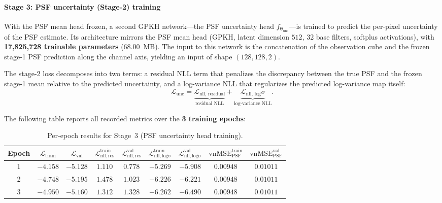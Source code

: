 \documentclass{aa}
\begin{document}
\paragraph{Stage 3: PSF uncertainty (Stage-2) training}

With the PSF mean head frozen, a second GPKH network---the PSF uncertainty head $f_{\boldsymbol{\theta}_\mathrm{unc}}$---is trained to predict the per-pixel uncertainty of the PSF estimate. Its architecture mirrors the PSF mean head (GPKH, latent dimension $512$, 32 base filters, softplus activations), with \textbf{17,825,728 trainable parameters} (68.00~MB). The input to this network is the concatenation of the observation cube and the frozen stage-1 PSF prediction along the channel axis, yielding an input of shape $(128, 128, 2)$.

The stage-2 loss decomposes into two terms: a residual NLL term that penalizes the discrepancy between the true PSF and the frozen stage-1 mean relative to the predicted uncertainty, and a log-variance NLL that regularizes the predicted log-variance map itself:
\begin{equation}
\mathcal{L}_\mathrm{unc}
=
\underbrace{\mathcal{L}_\mathrm{nll,\,residual}}_{\text{residual NLL}}
+
\underbrace{\mathcal{L}_\mathrm{nll,\,log}\sigma}_{\text{log-variance NLL}}.
\end{equation}

The following table reports all recorded metrics over the \textbf{3 training epochs}:

\begin{table}[h]
\centering
\begin{tabular}{|c|c|c|c|c|c|c|c|c|}
\hline
\textbf{Epoch} & $\mathcal{L}_\mathrm{train}$ & $\mathcal{L}_\mathrm{val}$ & $\mathcal{L}_\mathrm{nll,res}^\mathrm{train}$ & $\mathcal{L}_\mathrm{nll,res}^\mathrm{val}$ & $\mathcal{L}_\mathrm{nll,log\sigma}^\mathrm{train}$ & $\mathcal{L}_\mathrm{nll,log\sigma}^\mathrm{val}$ & $\mathrm{vnMSE}_\mathrm{PSF}^\mathrm{train}$ & $\mathrm{vnMSE}_\mathrm{PSF}^\mathrm{val}$ \\
\hline
1 & $-4.158$ & $-5.128$ & $1.110$ & $0.778$ & $-5.269$ & $-5.908$ & $0.00948$ & $0.01011$ \\
2 & $-4.748$ & $\mathbf{-5.195}$ & $1.478$ & $1.023$ & $-6.226$ & $-6.221$ & $0.00948$ & $0.01011$ \\
3 & $\mathbf{-4.950}$ & $-5.160$ & $1.312$ & $1.328$ & $-6.262$ & $-6.490$ & $0.00948$ & $0.01011$ \\
\hline
\end{tabular}
\caption{Per-epoch results for Stage~3 (PSF uncertainty head training).}
\label{tab:step3}
\end{table}
\end{document}
